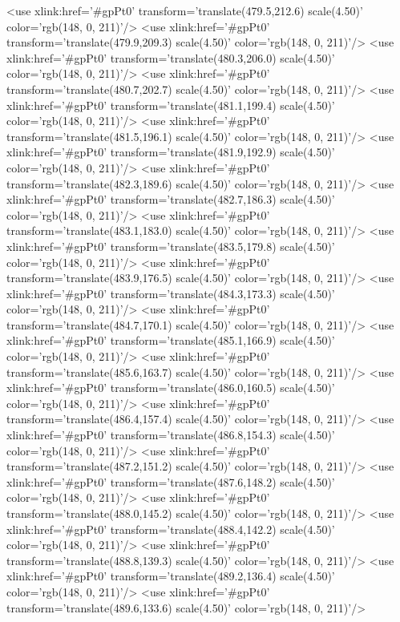 	<use xlink:href='#gpPt0' transform='translate(479.5,212.6) scale(4.50)' color='rgb(148,   0, 211)'/>
	<use xlink:href='#gpPt0' transform='translate(479.9,209.3) scale(4.50)' color='rgb(148,   0, 211)'/>
	<use xlink:href='#gpPt0' transform='translate(480.3,206.0) scale(4.50)' color='rgb(148,   0, 211)'/>
	<use xlink:href='#gpPt0' transform='translate(480.7,202.7) scale(4.50)' color='rgb(148,   0, 211)'/>
	<use xlink:href='#gpPt0' transform='translate(481.1,199.4) scale(4.50)' color='rgb(148,   0, 211)'/>
	<use xlink:href='#gpPt0' transform='translate(481.5,196.1) scale(4.50)' color='rgb(148,   0, 211)'/>
	<use xlink:href='#gpPt0' transform='translate(481.9,192.9) scale(4.50)' color='rgb(148,   0, 211)'/>
	<use xlink:href='#gpPt0' transform='translate(482.3,189.6) scale(4.50)' color='rgb(148,   0, 211)'/>
	<use xlink:href='#gpPt0' transform='translate(482.7,186.3) scale(4.50)' color='rgb(148,   0, 211)'/>
	<use xlink:href='#gpPt0' transform='translate(483.1,183.0) scale(4.50)' color='rgb(148,   0, 211)'/>
	<use xlink:href='#gpPt0' transform='translate(483.5,179.8) scale(4.50)' color='rgb(148,   0, 211)'/>
	<use xlink:href='#gpPt0' transform='translate(483.9,176.5) scale(4.50)' color='rgb(148,   0, 211)'/>
	<use xlink:href='#gpPt0' transform='translate(484.3,173.3) scale(4.50)' color='rgb(148,   0, 211)'/>
	<use xlink:href='#gpPt0' transform='translate(484.7,170.1) scale(4.50)' color='rgb(148,   0, 211)'/>
	<use xlink:href='#gpPt0' transform='translate(485.1,166.9) scale(4.50)' color='rgb(148,   0, 211)'/>
	<use xlink:href='#gpPt0' transform='translate(485.6,163.7) scale(4.50)' color='rgb(148,   0, 211)'/>
	<use xlink:href='#gpPt0' transform='translate(486.0,160.5) scale(4.50)' color='rgb(148,   0, 211)'/>
	<use xlink:href='#gpPt0' transform='translate(486.4,157.4) scale(4.50)' color='rgb(148,   0, 211)'/>
	<use xlink:href='#gpPt0' transform='translate(486.8,154.3) scale(4.50)' color='rgb(148,   0, 211)'/>
	<use xlink:href='#gpPt0' transform='translate(487.2,151.2) scale(4.50)' color='rgb(148,   0, 211)'/>
	<use xlink:href='#gpPt0' transform='translate(487.6,148.2) scale(4.50)' color='rgb(148,   0, 211)'/>
	<use xlink:href='#gpPt0' transform='translate(488.0,145.2) scale(4.50)' color='rgb(148,   0, 211)'/>
	<use xlink:href='#gpPt0' transform='translate(488.4,142.2) scale(4.50)' color='rgb(148,   0, 211)'/>
	<use xlink:href='#gpPt0' transform='translate(488.8,139.3) scale(4.50)' color='rgb(148,   0, 211)'/>
	<use xlink:href='#gpPt0' transform='translate(489.2,136.4) scale(4.50)' color='rgb(148,   0, 211)'/>
	<use xlink:href='#gpPt0' transform='translate(489.6,133.6) scale(4.50)' color='rgb(148,   0, 211)'/>
